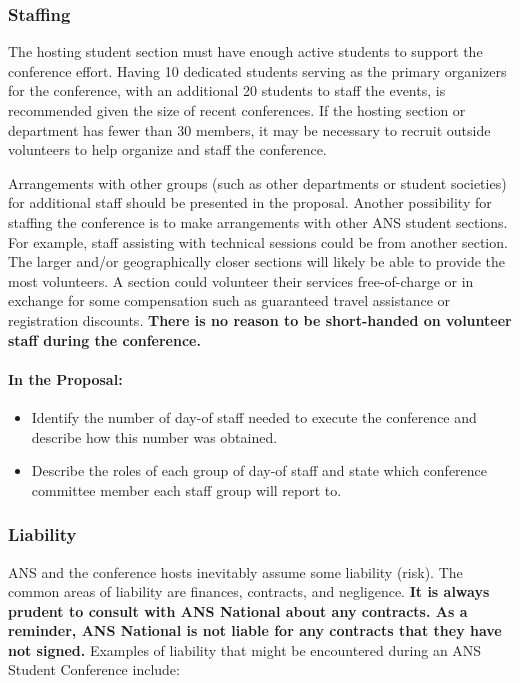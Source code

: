 \documentclass[12pt]{article}
\begin{document}
\subsubsection{Staffing}
The hosting student section must have enough active students to support the conference effort. Having 10 dedicated students serving as the primary organizers for the conference, with an additional 20 students to staff the events, is recommended given the size of recent conferences. If the hosting section or department has fewer than 30 members, it may be necessary to recruit outside volunteers to help organize and staff the conference.

Arrangements with other groups (such as other departments or student societies) for additional staff should be presented in the proposal. Another possibility for staffing the conference is to make arrangements with other ANS student sections. For example, staff assisting with technical sessions could  be from another section. The larger and/or geographically closer sections will likely be able to provide the most volunteers. A section could volunteer their services free-of-charge or in exchange for some compensation such as guaranteed travel assistance or registration discounts. \textbf{There is no reason to be short-handed on volunteer staff during the conference.}

\paragraph{In the Proposal:}
\begin{itemize}
\item{Identify the number of day-of staff needed to execute the conference and describe how this number was obtained.}
\item{Describe the roles of each group of day-of staff and state which conference committee member each staff group will report to.}
\end{itemize}

\subsubsection{Liability}\label{sec:liability}
ANS and the conference hosts inevitably assume some liability (risk). The common areas of liability are finances, contracts, and negligence. \textbf{It is always prudent to consult with ANS National about any contracts. As a reminder, ANS National is not liable for any contracts that they have not signed.} Examples of liability that might be encountered during an ANS Student Conference include:
\end{document}

